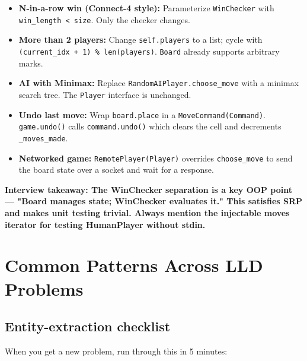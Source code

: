 \documentclass[11pt]{article}
\providecommand{\tightlist}{\setlength{\itemsep}{1pt}\setlength{\parskip}{0pt}}
\begin{document}
\begin{itemize}
\tightlist
\item
  \textbf{N-in-a-row win (Connect-4 style):} Parameterize \texttt{WinChecker} with \texttt{win\_length\ \textless{}\ size}. Only the checker changes.
\item
  \textbf{More than 2 players:} Change \texttt{self.players} to a list; cycle with \texttt{(current\_idx\ +\ 1)\ \%\ len(players)}. \texttt{Board} already supports arbitrary marks.
\item
  \textbf{AI with Minimax:} Replace \texttt{RandomAIPlayer.choose\_move} with a minimax search tree. The \texttt{Player} interface is unchanged.
\item
  \textbf{Undo last move:} Wrap \texttt{board.place} in a \texttt{MoveCommand(Command)}. \texttt{game.undo()} calls \texttt{command.undo()} which clears the cell and decrements \texttt{\_moves\_made}.
\item
  \textbf{Networked game:} \texttt{RemotePlayer(Player)} overrides \texttt{choose\_move} to send the board state over a socket and wait for a response.
\end{itemize}

\textbf{Interview takeaway: The WinChecker separation is a key OOP point --- "Board manages state; WinChecker evaluates it." This satisfies SRP and makes unit testing trivial. Always mention the injectable moves iterator for testing HumanPlayer without stdin.}

\section{Common Patterns Across LLD Problems}\label{common-patterns-across-lld-problems}

\subsection{Entity-extraction checklist}\label{entity-extraction-checklist}

When you get a new problem, run through this in 5 minutes:
\end{document}
